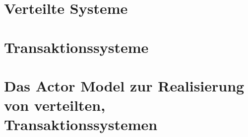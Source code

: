
\chapter{Verteilte Systeme}
\chapter{Transaktionssysteme}
\chapter{Das Actor Model zur Realisierung von verteilten, Transaktionssystemen} 